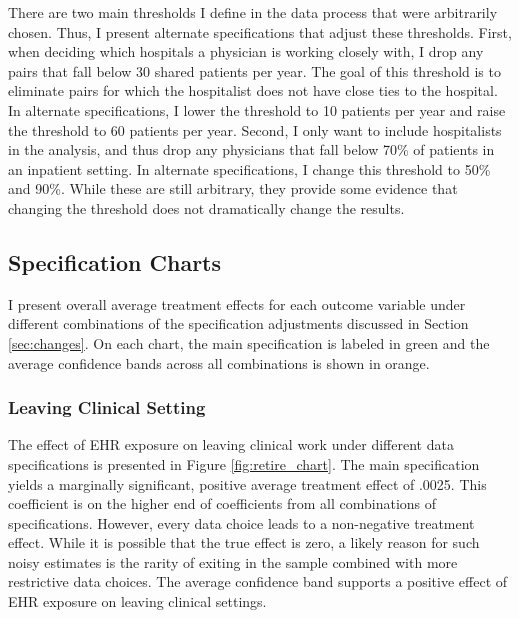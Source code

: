 \documentclass[12pt]{article}
\begin{document}
There are two main thresholds I define in the data process that were arbitrarily chosen. Thus, I present alternate specifications that adjust these thresholds. First, when deciding which hospitals a physician is working closely with, I drop any pairs that fall below 30 shared patients per year. The goal of this threshold is to eliminate pairs for which the hospitalist does not have close ties to the hospital. In alternate specifications, I lower the threshold to 10 patients per year and raise the threshold to 60 patients per year. Second, I only want to include hospitalists in the analysis, and thus drop any physicians that fall below 70\% of patients in an inpatient setting. In alternate specifications, I change this threshold to 50\% and 90\%. While these are still arbitrary, they provide some evidence that changing the threshold does not dramatically change the results. 


\subsection{Specification Charts}\label{sec:chart}

I present overall average treatment effects for each outcome variable under different combinations of the specification adjustments discussed in Section \ref{sec:changes}. On each chart, the main specification is labeled in green and the average confidence bands across all combinations is shown in orange. 

\subsubsection{Leaving Clinical Setting}

The effect of EHR exposure on leaving clinical work under different data specifications is presented in Figure \ref{fig:retire_chart}. The main specification yields a marginally significant, positive average treatment effect of .0025. This coefficient is on the higher end of coefficients from all combinations of specifications. However, every data choice leads to a non-negative treatment effect. While it is possible that the true effect is zero, a likely reason for such noisy estimates is the rarity of exiting in the sample combined with more restrictive data choices. The average confidence band supports a positive effect of EHR exposure on leaving clinical settings. 
\end{document}
